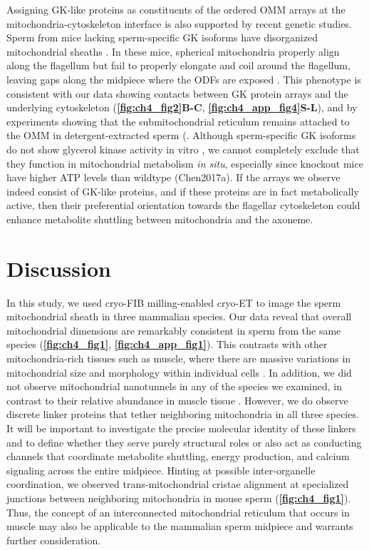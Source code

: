 Assigning GK-like proteins as constituents of the ordered OMM arrays at the mito\-chondria-cytoskeleton interface is also supported by recent genetic studies. Sperm from mice lacking sperm-specific GK isoforms have disorganized mitochondrial sheaths \cite{Chen2017a, Shimada2019}. In these mice, spherical mitochondria properly align along the flagellum but fail to properly elongate and coil around the flagellum, leaving gaps along the midpiece where the ODFs are exposed \cite{Shimada2019}. This phenotype is consistent with our data showing contacts between GK protein arrays and the underlying cytoskeleton (\textbf{\autoref{fig:ch4_fig2}B-C}, \textbf{\autoref{fig:ch4_app_fig4}S-L}), and by experiments showing that the submitochondrial reticulum remains attached to the OMM in detergent-extracted sperm (\cite{Olson1990}. Although sperm-specific GK isoforms do not show glycerol kinase activity in vitro \cite{Pan1999}, we cannot completely exclude that they function in mitochondrial metabolism \emph{in situ}, especially since knockout mice have higher ATP levels than wildtype (Chen2017a). If the arrays we observe indeed consist of GK-like proteins, and if these proteins are in fact metabolically active, then their preferential orientation towards the flagellar cytoskeleton could enhance metabolite shuttling between mitochondria and the axoneme.
%
\section{Discussion}
In this study, we used cryo-FIB milling-enabled cryo-ET to image the sperm mitochondrial sheath in three mammalian species. Our data reveal that overall mitochondrial dimensions are remarkably consistent in sperm from the same species (\textbf{\autoref{fig:ch4_fig1}}, \textbf{\autoref{fig:ch4_app_fig1}}). This contrasts with other mitochondria-rich tissues such as muscle, where there are massive variations in mitochondrial size and morphology within individual cells \cite{Vincent2019}. In addition, we did not observe mitochondrial nanotunnels in any of the species we examined, in contrast to their relative abundance in muscle tissue \cite{Vincent2017, Vincent2019}. However, we do observe discrete linker proteins that tether neighboring mitochondria in all three species. It will be important to investigate the precise molecular identity of these linkers and to define whether they serve purely structural roles or also act as conducting channels that coordinate metabolite shuttling, energy production, and calcium signaling across the entire midpiece. Hinting at possible inter-organelle coordination, we observed trans-mitochondrial cristae alignment at specialized junctions between neighboring mitochondria in mouse sperm (\textbf{\autoref{fig:ch4_fig1}}). Thus, the concept of an interconnected mitochondrial reticulum that occurs in muscle \cite{Glancy2015} may also be applicable to the ma\-mmalian sperm midpiece and warrants further consideration.

